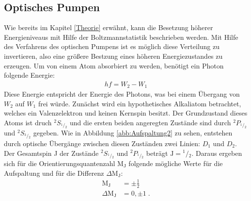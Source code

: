 \subsection{Optisches Pumpen}
Wie bereits im Kapitel \ref{Theorie} erwähnt, kann die Besetzung höherer Energieniveaus mit Hilfe der Boltzmannstatistik beschrieben werden.
Mit Hilfe des Verfahrens des optischen Pumpens ist es möglich diese Verteilung zu invertieren, also eine größere Bestzung eines höheren Energiezustandes zu erzeugen.
Um von einem Atom absorbiert zu werden, benötigt ein Photon folgende Energie:
\begin{align*}
    hf = W_{2} - W_{1}
\end{align*}
Diese Energie entspricht der Energie des Photons, was bei einem Übergang von $W_{2}$ auf $W_{1}$ frei würde.
Zunächst wird ein hypothetisches Alkaliatom betrachtet, welches ein Valenzelektron und keinen Kernspin besitzt.
Der Grundzustand dieses Atoms ist druch ${}^2S_{{}^1\!/\!_2}$ und die ersten beiden angeregten Zustände sind durch ${}^2P_{{}^1\!/\!_2}$ und ${}^2S_{{}^3\!/\!_2}$ gegeben. Wie in Abbildung \ref{abb:Aufspaltung2} zu sehen, entstehen durch optische Übergänge zwischen diesen Zuständen zwei Linien: $D_{1}$ und $ D_{2} $.
Der Gesamtspin J der Zustände ${}^2S_{{}^1\!/\!_2}$ und ${}^2P_{{}^1\!/\!_2}$ beträgt $\text{J}= {}^1\!/\!_2$. Daraus ergeben sich für die Orientierungsquantenzahl $\text{M}_\text{J}$ folgende mögliche Werte für die Aufspaltung und für die Differenz $\Delta \text{M}_\text{J}$:
\begin{align*}
    \text{M}_\text{J} &= \pm \frac{1}{2} \\
    \Delta \text{M}_\text{J} &= 0, \pm 1 \; .
\end{align*}
\FloatBarrier
